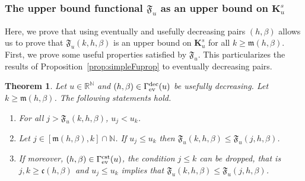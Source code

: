 \documentclass{article}
\def\funset{\Gamma}
\def\fmong{\funset_{{\rm ev}}^{\rm dec}}
\def\fcste{\funset_{{\rm ev}}^{\rm cst}}
\def\mon{\mathfrak{m}}
\def\cst{\mathfrak{c}}
\def\Fu{\mathfrak{F}_u}
\def\rr{\mathbb R}
\def\nn{\mathbb N}
\def\bigks{\mathbf{K}^s}
\newtheorem{theorem}{Theorem}
\def\red#1{#1}
\def\blue#1{#1}
\begin{document}
	\subsubsection{The upper bound functional $\Fu$ as an upper bound on $\bigks_u$}
	Here, we prove that using eventually and usefully decreasing pairs $(h,\beta)$ \red{allows us} to prove that $\Fu(k,h,\beta)$ is an upper bound \red{on} $\bigks_u$ for all $k\geq \mon(h,\beta)$. First, we prove some useful properties satisfied by $\Fu$. This particularizes the results of Proposition~\ref{prop:simpleFuprop} to eventually decreasing pairs.
	\begin{theorem}
		\label{mainprop}
		Let $u\in\rr^\nn$ and \blue{$(h,\beta)\in \fmong(u)$ be usefully decreasing}. Let \blue{$k\geq\mon(h,\beta)$}. The following statements hold.
		\begin{enumerate}
			\item For all $j>\Fu(k,h,\beta)$, $u_j<u_k$.
			\item Let $j\in [\mon(h,\beta),k]\cap \nn$. If $u_j\leq u_k$ then $\Fu(k,h,\beta)\leq \Fu(j,h,\beta)$. 
\item			
			\blue{If moreover, $(h,\beta)\in\fcste(u)$, the condition $j\leq k$ can be dropped, that is $j,k\geq\cst(h,\beta)$ and $u_j\leq u_k$ implies that $\Fu(k,h,\beta)\leq \Fu(j,h,\beta)$.
			}
		\end{enumerate}
	\end{theorem}
\end{document}
